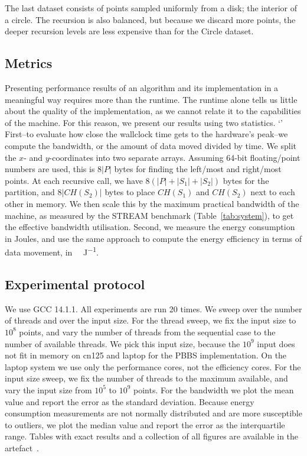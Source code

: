 \documentclass[11pt,a4paper]{article}
\begin{document}
The last dataset consists of points sampled uniformly from a disk; the interior of a circle.
The recursion is also balanced, but because we discard more points, the deeper recursion levels are less expensive than for the Circle dataset.

\subsection{Metrics}\label{sec:metrics}
Presenting performance results of an algorithm and its implementation in a meaningful way requires more than the runtime.
The runtime alone tells us little about the quality of the implementation, as we cannot relate it to the capabilities of the machine.
For this reason, we present our results using two statistics.
`'
First\---to evaluate how close the wallclock time gets to the hardware's peak\---we compute the bandwidth, or the amount of data moved divided by time.
We split the $x$- and $y$-coordinates into two separate arrays.
Assuming 64-bit floating\-/point numbers are used, this is $8|P|$ bytes for finding the left\-/most and right\-/most points.
At each recursive call, we have $8(|P| + |S_1| + |S_2|)$ bytes for the partition, and $8|CH(S_2)|$ bytes to place $CH(S_1)$ and $CH(S_2)$ next to each other in memory.
We then scale this by the maximum practical bandwidth of the machine, as measured by the STREAM benchmark (Table~\ref{tab:system}), to get the effective bandwidth utilisation.
Second, we measure the energy consumption in Joules, and use the same approach to compute the energy efficiency in terms of data movement, in \si{\giga\byte\per\joule}.

\subsection{Experimental protocol}
We use GCC 14.1.1.
All experiments are run \num{20} times.
We sweep over the number of threads and over the input size.
For the thread sweep, we fix the input size to $10^8$ points, and vary the number of threads from the sequential case to the number of available threads.
We pick this input size, because the $10^9$ input does not fit in memory on cn125 and laptop for the PBBS implementation.
On the laptop system we use only the performance cores, not the efficiency cores.
For the input size sweep, we fix the number of threads to the maximum available, and vary the input size from $10^5$ to $10^9$ points.
For the bandwidth we plot the mean value and report the error as the standard deviation.
Because energy consumption measurements are not normally distributed and are more susceptible to outliers, we plot the median value and report the error as the interquartile range.
Tables with exact results and a collection of all figures are available in the artefact~\cite{vqhull2025artefact}.
\end{document}
